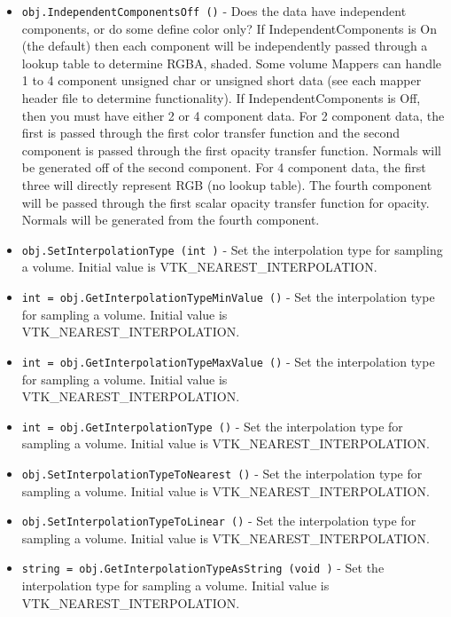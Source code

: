 \begin{itemize}
\item  \verb|obj.IndependentComponentsOff ()| -  Does the data have independent components, or do some define color 
 only? If IndependentComponents is On (the default) then each component 
 will be independently passed through a lookup table to determine RGBA, 
 shaded. Some volume Mappers can handle 1 to 4 component 
 unsigned char or unsigned short data (see each mapper header file to
 determine functionality). If IndependentComponents is Off, then you 
 must have either 2 or 4 component data. For 2 component data, the 
 first is passed through the first color transfer function and the 
 second component is passed through the first opacity transfer function. 
 Normals will be generated off of the second component. For 4 component 
 data, the first three will directly represent RGB (no lookup table). 
 The fourth component will be passed through the first scalar opacity 
 transfer function for opacity. Normals will be generated from the fourth 
 component.

\item  \verb|obj.SetInterpolationType (int )| -  Set the interpolation type for sampling a volume. Initial value is
 VTK\_NEAREST\_INTERPOLATION.

\item  \verb|int = obj.GetInterpolationTypeMinValue ()| -  Set the interpolation type for sampling a volume. Initial value is
 VTK\_NEAREST\_INTERPOLATION.

\item  \verb|int = obj.GetInterpolationTypeMaxValue ()| -  Set the interpolation type for sampling a volume. Initial value is
 VTK\_NEAREST\_INTERPOLATION.

\item  \verb|int = obj.GetInterpolationType ()| -  Set the interpolation type for sampling a volume. Initial value is
 VTK\_NEAREST\_INTERPOLATION.

\item  \verb|obj.SetInterpolationTypeToNearest ()| -  Set the interpolation type for sampling a volume. Initial value is
 VTK\_NEAREST\_INTERPOLATION.

\item  \verb|obj.SetInterpolationTypeToLinear ()| -  Set the interpolation type for sampling a volume. Initial value is
 VTK\_NEAREST\_INTERPOLATION.

\item  \verb|string = obj.GetInterpolationTypeAsString (void )| -  Set the interpolation type for sampling a volume. Initial value is
 VTK\_NEAREST\_INTERPOLATION.


\end{itemize}
